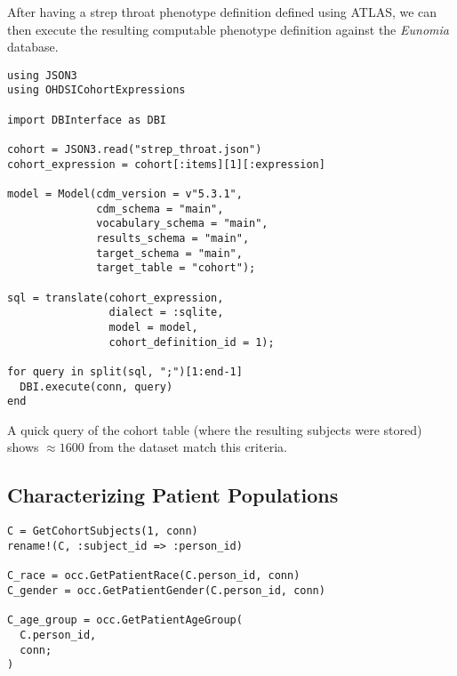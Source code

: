 \documentclass{juliacon}
\begin{document}
After having a strep throat phenotype definition defined using ATLAS, we can then execute the resulting computable phenotype definition against the \textit{Eunomia} database.

\begin{verbatim}
using JSON3 
using OHDSICohortExpressions

import DBInterface as DBI

cohort = JSON3.read("strep_throat.json")
cohort_expression = cohort[:items][1][:expression]

model = Model(cdm_version = v"5.3.1", 
              cdm_schema = "main",
              vocabulary_schema = "main", 
              results_schema = "main",
              target_schema = "main", 
              target_table = "cohort");

sql = translate(cohort_expression, 
                dialect = :sqlite, 
                model = model, 
                cohort_definition_id = 1);

for query in split(sql, ";")[1:end-1]
  DBI.execute(conn, query)
end
\end{verbatim}

A quick query of the cohort table (where the resulting subjects were stored) shows $\approx 1600$ from the dataset match this criteria.

\subsection{Characterizing Patient Populations}


\begin{verbatim}
C = GetCohortSubjects(1, conn)
rename!(C, :subject_id => :person_id)

C_race = occ.GetPatientRace(C.person_id, conn)
C_gender = occ.GetPatientGender(C.person_id, conn)

C_age_group = occ.GetPatientAgeGroup(
  C.person_id, 
  conn; 
)
\end{verbatim}
\end{document}
